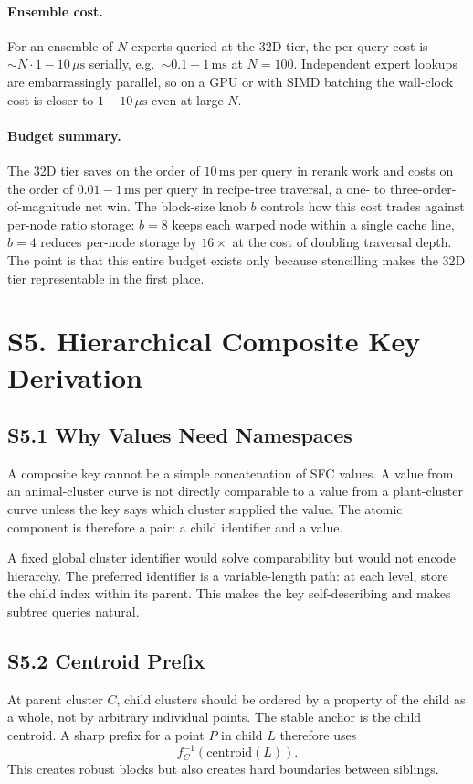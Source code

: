 \documentclass[11pt]{article}
\begin{document}
\paragraph{Ensemble cost.}
For an ensemble of $N$ experts queried at the 32D tier, the per-query cost is $\sim N\cdot 1{-}10\,\mu\mathrm{s}$ serially, e.g.\ $\sim 0.1{-}1\,\mathrm{ms}$ at $N=100$. Independent expert lookups are embarrassingly parallel, so on a GPU or with SIMD batching the wall-clock cost is closer to $1{-}10\,\mu\mathrm{s}$ even at large $N$.

\paragraph{Budget summary.}
The 32D tier saves on the order of $10\,\mathrm{ms}$ per query in rerank work and costs on the order of $0.01{-}1\,\mathrm{ms}$ per query in recipe-tree traversal, a one- to three-order-of-magnitude net win. The block-size knob $b$ controls how this cost trades against per-node ratio storage: $b=8$ keeps each warped node within a single cache line, $b=4$ reduces per-node storage by $16\times$ at the cost of doubling traversal depth. The point is that this entire budget exists only because stencilling makes the 32D tier representable in the first place.

\section*{S5. Hierarchical Composite Key Derivation}
\label{sec:si-composite-key}

\subsection*{S5.1 Why Values Need Namespaces}
A composite key cannot be a simple concatenation of SFC values. A value from an animal-cluster curve is not directly comparable to a value from a plant-cluster curve unless the key says which cluster supplied the value. The atomic component is therefore a pair: a child identifier and a value.

A fixed global cluster identifier would solve comparability but would not encode hierarchy. The preferred identifier is a variable-length path: at each level, store the child index within its parent. This makes the key self-describing and makes subtree queries natural.

\subsection*{S5.2 Centroid Prefix}
At parent cluster $C$, child clusters should be ordered by a property of the child as a whole, not by arbitrary individual points. The stable anchor is the child centroid. A sharp prefix for a point $P$ in child $L$ therefore uses
\[
f_C^{-1}(\mathrm{centroid}(L)).
\]
This creates robust blocks but also creates hard boundaries between siblings.
\end{document}
